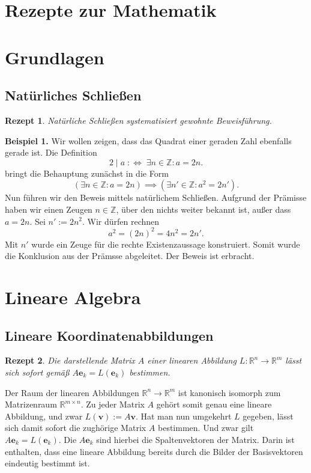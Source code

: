 \documentclass[a4paper,10pt,fleqn,twocolumn,twoside,dvipdfmx]{scrartcl}
\theoremstyle{rmbox}
\newtheorem{Rezept}{Rezept}[section]
\newcommand{\strong}[1]{\textsf{\textbf{#1}}}
\newcommand{\bv}[1]{\mathbf{#1}}
\newcommand{\Z}{\mathbb Z}
\newcommand{\R}{\mathbb R}
\newcommand{\defiff}{\;:\Longleftrightarrow\;}
\begin{document}
\thispagestyle{empty}

\section*{\LARGE Rezepte zur Mathematik}

\tableofcontents

\clearpage
\section{Grundlagen}

\subsection{Natürliches Schließen}

\begin{Rezept}
Natürliche Schließen systematisiert gewohnte Beweisführung.
\end{Rezept}
\strong{Beispiel 1.}
Wir wollen zeigen, dass das Quadrat einer geraden Zahl ebenfalls
gerade ist. Die Definition
\[2\mid a \defiff \exists n\in\Z\colon a = 2n.\]
bringt die Behauptung zunächst in die Form
\[(\exists n\in\Z\colon a = 2n) \implies (\exists n'\in\Z\colon a^2 = 2n').\]
Nun führen wir den Beweis mittels natürlichem Schließen. Aufgrund
der Prämisse haben wir einen Zeugen $n\in\Z$, über den nichts
weiter bekannt ist, außer dass $a=2n$. Sei $n':=2n^2$. Wir dürfen
rechnen
\[a^2 = (2n)^2 = 4n^2 = 2n'.\]
Mit $n'$ wurde ein Zeuge für die rechte Existenzaussage konstruiert.
Somit wurde die Konklusion aus der Prämsse abgeleitet. Der Beweis
ist erbracht.

\section{Lineare Algebra}

\subsection{Lineare Koordinatenabbildungen}

\begin{Rezept}
Die darstellende Matrix $A$ einer linearen Abbildung $L\colon\R^n\to\R^m$
lässt sich sofort gemäß $A\bv e_k = L(\bv e_k)$ bestimmen.
\end{Rezept}

\noindent
Der Raum der linearen Abbildungen $\R^n\to\R^m$ ist kanonisch isomorph
zum Matrizenraum $\R^{m\times n}$. Zu jeder Matrix $A$ gehört somit
genau eine lineare Abbildung, und zwar $L(\bv v):=A\bv v$. Hat man nun
umgekehrt $L$ gegeben, lässt sich damit sofort die zughörige Matrix
$A$ bestimmen. Und zwar gilt $A\bv e_k = L(\bv e_k)$. Die $A\bv e_k$
sind hierbei die Spaltenvektoren der Matrix. Darin ist enthalten,
dass eine lineare Abbildung bereits durch die Bilder der Basisvektoren
eindeutig bestimmt ist.
\end{document}
